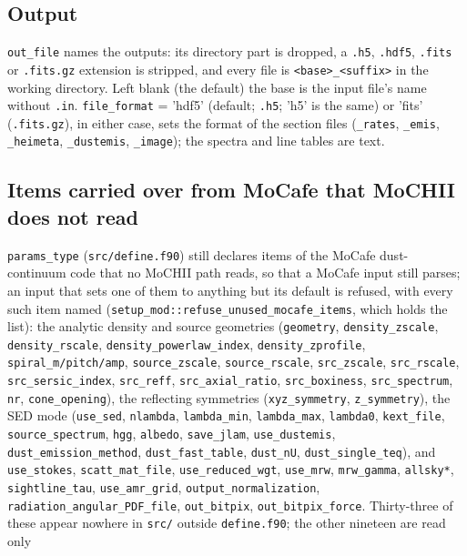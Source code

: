\documentclass[english,a4paper]{my_memo}
\newcommand{\code}[1]{\texttt{#1}}
\begin{document}
\subsection{Output}
\code{out\_file} names the outputs: its directory part is dropped, a
\code{.h5}, \code{.hdf5}, \code{.fits} or \code{.fits.gz} extension is stripped, and every file is \code{<base>\_<suffix>} in the working
directory.  Left blank (the default) the base is the input file's name without \code{.in}.
\code{file\_format} = 'hdf5' (default; \code{.h5}; 'h5' is the same) or
'fits' (\code{.fits.gz}), in either case, sets the format of the section files (\code{\_rates},
\code{\_emis}, \code{\_heimeta}, \code{\_dustemis}, \code{\_image}); the
spectra and line tables are text.

\subsection{Items carried over from MoCafe that MoCHII does not read}
\label{sec:mocafe_items}
\code{params\_type} (\code{src/define.f90}) still declares items of the
MoCafe dust-continuum code that no MoCHII path reads, so that a MoCafe input
still parses; an input that sets one of them to anything but its default is
refused, with every such item named
(\code{setup\_mod::refuse\_unused\_mocafe\_items}, which holds the list):
the analytic density and source geometries (\code{geometry},
\code{density\_zscale}, \code{density\_rscale}, \code{density\_powerlaw\_index},
\code{density\_zprofile}, \code{spiral\_m/pitch/amp}, \code{source\_zscale},
\code{source\_rscale}, \code{src\_zscale}, \code{src\_rscale},
\code{src\_sersic\_index}, \code{src\_reff}, \code{src\_axial\_ratio},
\code{src\_boxiness}, \code{src\_spectrum}, \code{nr}, \code{cone\_opening}),
the reflecting symmetries (\code{xyz\_symmetry}, \code{z\_symmetry}),
the SED mode (\code{use\_sed}, \code{nlambda}, \code{lambda\_min},
\code{lambda\_max}, \code{lambda0}, \code{kext\_file}, \code{source\_spectrum},
\code{hgg}, \code{albedo}, \code{save\_jlam}, \code{use\_dustemis},
\code{dust\_emission\_method}, \code{dust\_fast\_table}, \code{dust\_nU},
\code{dust\_single\_teq}), and \code{use\_stokes}, \code{scatt\_mat\_file},
\code{use\_reduced\_wgt}, \code{use\_mrw}, \code{mrw\_gamma}, \code{allsky*},
\code{sightline\_tau}, \code{use\_amr\_grid}, \code{output\_normalization},
\code{radiation\_angular\_PDF\_file}, \code{out\_bitpix},
\code{out\_bitpix\_force}.  Thirty-three of these appear nowhere in
\code{src/} outside \code{define.f90}; the other nineteen are read only
\end{document}
